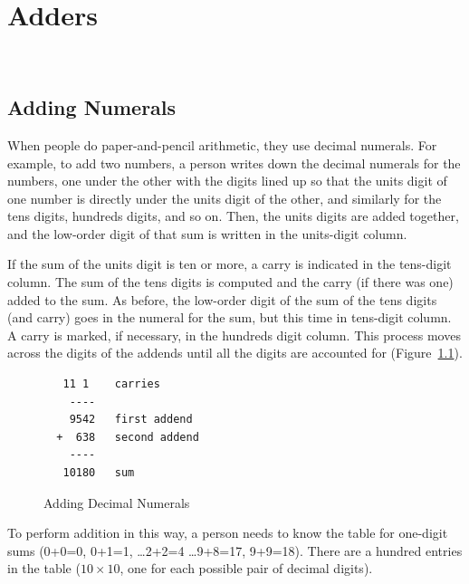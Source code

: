 \chapter{Adders}
\label{ch:adders}\


\section{Adding Numerals}
\label{sec:addition-by-numeral}

When people do paper-and-pencil arithmetic,
they use decimal numerals.
For example, to add two numbers, a person
writes down the decimal numerals for the numbers,
one under the other with the digits lined up so that
the units digit of one number is directly under
the units digit of the other, and similarly for
the tens digits, hundreds digits, and so on.
Then, the units digits are added together,
and the low-order digit of that sum is written
in the units-digit column.

If the sum of the units digit is ten or more, a
carry is indicated in the tens-digit column.
The sum of the tens digits is computed and the
carry (if there was one) added to the sum.
As before, the low-order digit of the sum of the
tens digits (and carry) goes in the numeral for the sum,
but this time in tens-digit column.
A carry is marked, if necessary,
in the hundreds digit column.
This process moves across the digits of the addends until all the digits
are accounted for (Figure~\ref{fig:adding-decimal-numerals}).

\begin{figure}
\begin{center}
\begin{minipage}[b]{0.4\textwidth}
\begin{verbatim}
   11 1    carries
    ----
    9542   first addend
  +  638   second addend
    ----
   10180   sum
\end{verbatim}
\end{minipage}
\end{center}
\caption{Adding Decimal Numerals}
\label{fig:adding-decimal-numerals}
\end{figure}

To perform addition in this way, a person needs to know
the table for one-digit sums (0+0=0, 0+1=1, \dots 2+2=4 \dots 9+8=17, 9+9=18).
There are a hundred entries in the table ($10 \times 10$, one for each
possible pair of decimal digits).

